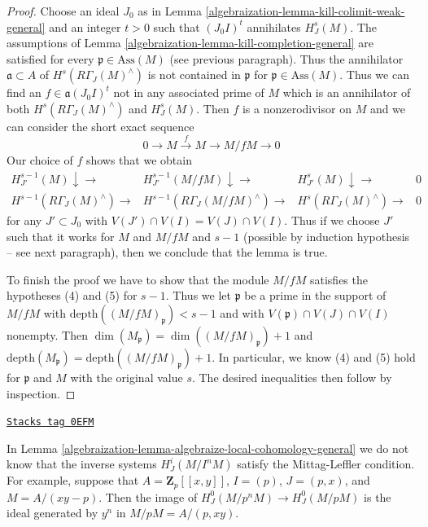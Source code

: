 \begin{proof}
\medskip\noindent
Choose an ideal $J_0$ as in Lemma \ref{algebraization-lemma-kill-colimit-weak-general}
and an integer $t > 0$ such that $(J_0I)^t$ annihilates $H^s_J(M)$.
The assumptions of Lemma \ref{algebraization-lemma-kill-completion-general}
are satisfied for every $\mathfrak p \in \text{Ass}(M)$
(see previous paragraph).
Thus the annihilator $\mathfrak a \subset A$ of
$H^s(R\Gamma_J(M)^\wedge)$
is not contained in $\mathfrak p$ for $\mathfrak p \in \text{Ass}(M)$.
Thus we can find an $f \in \mathfrak a(J_0I)^t$
not in any associated prime of $M$ which is an annihilator
of both $H^s(R\Gamma_J(M)^\wedge)$ and $H^s_J(M)$.
Then $f$ is a nonzerodivisor on $M$ and we can consider the
short exact sequence
$$
0 \to M \xrightarrow{f} M \to M/fM \to 0
$$
Our choice of $f$ shows that we obtain
$$
\begin{array}{cccc}H^{s - 1}_{J'}(M) \downarrow\longrightarrow & H^{s - 1}_{J'}(M/fM) \downarrow\longrightarrow & H^s_{J'}(M) \downarrow\longrightarrow & 0 \\ H^{s - 1}(R\Gamma_J(M)^\wedge) \longrightarrow & H^{s - 1}(R\Gamma_J(M/fM)^\wedge) \longrightarrow & H^s(R\Gamma_J(M)^\wedge) \longrightarrow & 0\end{array}
$$
for any $J' \subset J_0$ with $V(J') \cap V(I) = V(J) \cap V(I)$.
Thus if we choose $J'$ such that it works for
$M$ and $M/fM$ and $s - 1$ (possible by induction hypothesis --
see next paragraph), then we conclude that the lemma is true.

\medskip\noindent
To finish the proof we have to show that the module
$M/fM$ satisfies the hypotheses (4) and (5) for $s - 1$.
Thus we let $\mathfrak p$ be a prime in the support
of $M/fM$ with $\text{depth}((M/fM)_\mathfrak p) < s - 1$
and with $V(\mathfrak p) \cap V(J) \cap V(I)$ nonempty.
Then $\dim(M_\mathfrak p) = \dim((M/fM)_\mathfrak p) + 1$
and $\text{depth}(M_\mathfrak p) = \text{depth}((M/fM)_\mathfrak p) + 1$.
In particular, we know (4) and (5) hold for $\mathfrak p$ and $M$
with the original value $s$.
The desired inequalities then follow by inspection.
\end{proof}

\begin{example}[No ML]
\label{algebraization-example-no-ML}
\href{https://stacks.math.columbia.edu/tag/0EFM}{\texttt{Stacks tag 0EFM}}

In Lemma \ref{algebraization-lemma-algebraize-local-cohomology-general}
we do not know that the inverse systems $H^i_J(M/I^nM)$ satisfy the
Mittag-Leffler condition.
For example, suppose that $A = \mathbf{Z}_p[[x, y]]$, $I = (p)$,
$J = (p, x)$, and $M = A/(xy - p)$. Then the image of
$H^0_J(M/p^nM) \to H^0_J(M/pM)$
is the ideal generated by $y^n$ in $M/pM = A/(p, xy)$.
\end{example}

